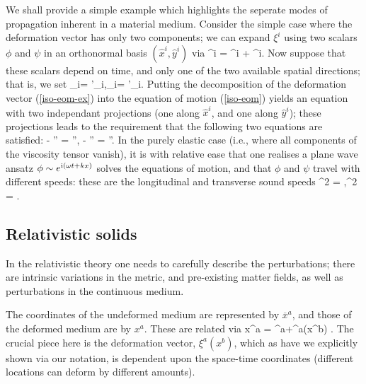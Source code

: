 We shall provide a simple example which highlights the seperate modes of propagation inherent in a material medium. Consider the simple case where the deformation vector has only two components; we can expand $\xi^i$ using two scalars $\phi$ and $\psi$ in an orthonormal basis $(\hat{x}^i, \hat{y}^i)$ via
\bse
\label{iso-eom-ex}
\bea
\xi^i = \phi{}^i + \psi{}^i.
\eea
Now suppose that these scalars depend on time, and only one of the two available spatial directions; that is, we set
\bea
\partial_i\phi = \phi'_i,\qquad \partial_i\psi = \psi'_i.
\eea
\ese
Putting the decomposition of the deformation vector (\ref{iso-eom-ex}) into the equation of motion (\ref{iso-eom}) yields an equation with two independant projections (one along $\hat{x}^i$, and one along $\hat{y}^i$); these projections leads to the requirement that the following two equations are satisfied:
\bea
\ddot{\phi} - \dot{\phi}'' = \phi'',\qquad
\ddot{\psi} - \frac{\nu}{\rho}\dot{\psi}'' = \frac{\mu}{\rho}\psi''.
\eea
In the purely elastic case (i.e., where all components of the viscosity tensor vanish), it is with relative ease that one realises a plane wave ansatz $\phi \sim e^{\textrm{i}\left( \omega t + kx \right)}$ solves the equations of motion, and that $\phi$ and $\psi$ travel with different speeds: these are the  longitudinal and transverse sound speeds
\bea
{}^2 = ,\qquad {}^2 = \frac{\mu}{\rho}.
\eea
\subsection{Relativistic solids}
In the relativistic theory one needs to carefully describe the perturbations; there are intrinsic variations in the metric, and pre-existing matter fields, as well as perturbations in the continuous medium.  

The coordinates of the undeformed medium are represented by $\overline{x}^a$, and those of the deformed medium are by $x^a$. These are related via
\bea
 x^a =  ^a+\xi^a(x^b) .
\eea
The crucial piece here is the deformation vector, $\xi^a(x^b)$, which as have we explicitly shown via our notation, is dependent upon the space-time coordinates (different locations can deform by different amounts).

